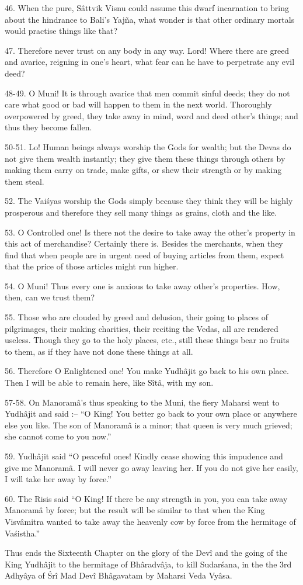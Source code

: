 46. When the pure, S\^attvik Visnu could assume this dwarf incarnation to bring about the hindrance to Bali's Yaj\~na, what wonder is that other ordinary mortals would practise things like that?

47. Therefore never trust on any body in any way. Lord! Where there are greed and avarice, reigning in one's heart, what fear can he have to perpetrate any evil deed?

48-49. O Muni! It is through avarice that men commit sinful deeds; they do not care what good or bad will happen to them in the next world. Thoroughly overpowered by greed, they take away in mind, word and deed other's things; and thus they become fallen.

50-51. Lo! Human beings always worship the Gods for wealth; but the Devas do not give them wealth instantly; they give them these things through others by making them carry on trade, make gifts, or shew their strength or by making them steal.

52. The Vai\'syas worship the Gods simply because they think they will be highly prosperous and therefore they sell many things as grains, cloth and the like.

53. O Controlled one! Is there not the desire to take away the other's property in this act of merchandise? Certainly there is. Besides the merchants, when they find that when people are in urgent need of buying articles from them, expect that the price of those articles might run higher.

54. O Muni! Thus every one is anxious to take away other's properties. How, then, can we trust them?

55. Those who are clouded by greed and delusion, their going to places of pilgrimages, their making charities, their reciting the Vedas, all are rendered useless. Though they go to the holy places, etc., still these things bear no fruits to them, as if they have not done these things at all.

56. Therefore O Enlightened one! You make Yudh\^ajit go back to his own place. Then I will be able to remain here, like S\^it\^a, with my son.

57-58. On Manoram\^a's thus speaking to the Muni, the fiery Maharsi went to Yudh\^ajit and said :-- ``O King! You better go back to your own place or anywhere else you like. The son of Manoram\^a is a minor; that queen is very much grieved; she cannot come to you now.''

59. Yudh\^ajit said ``O peaceful ones! Kindly cease showing this impudence and give me Manoram\^a. I will never go away leaving her. If you do not give her easily, I will take her away by force.''

60. The Risis said ``O King! If there be any strength in you, you can take away Manoram\^a by force; but the result will be similar to that when the King Visv\^amitra wanted to take away the heavenly cow by force from the hermitage of Va\'sistha.''

Thus ends the Sixteenth Chapter on the glory of the Dev\^i and the going of the King Yudh\^ajit to the hermitage of Bh\^aradv\^aja, to kill Sudar\'sana, in the the 3rd Adhy\^aya of \'Sr\^i Mad Dev\^i Bh\^agavatam by Maharsi Veda Vy\^asa.

